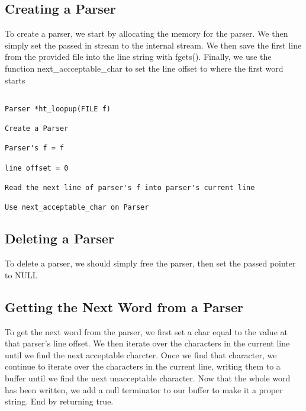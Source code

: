 \documentclass[11pt]{article}
\begin{document}
\subsection{Creating a Parser}

To create a parser, we start by allocating the memory for the parser. We then simply set the passed in stream to the internal stream. We then save the first line from the provided file into the line string with fgets(). Finally, we use the function next\_accceptable\_char to set the line offset to where the first word starts

\begin{verbatim}

Parser *ht_loopup(FILE f)

Create a Parser

Parser's f = f

line offset = 0

Read the next line of parser's f into parser's current line

Use next_acceptable_char on Parser

\end{verbatim}

\subsection{Deleting a Parser}

To delete a parser, we should simply free the parser, then set the passed pointer to NULL

\subsection{Getting the Next Word from a Parser}

To get the next word from the parser, we first set a char equal to the value at that parser's line offset. We then iterate over the characters in the current line until we find the next acceptable charcter. Once we find that character, we continue to iterate over the characters in the current line, writing them to a buffer until we find the next unacceptable character. Now that the whole word has been written, we add a null terminator to our buffer to make it a proper string. End by returning true.
\end{document}

